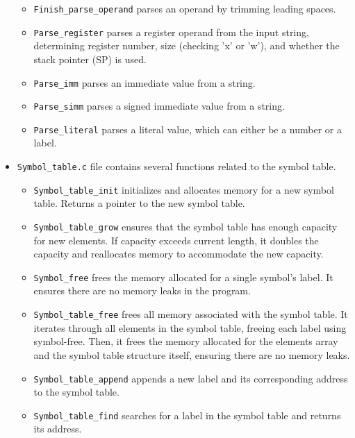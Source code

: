 \documentclass[11pt]{article}
\begin{document}
\begin{itemize}
\begin{itemize}
        \item \verb|Finish_parse_operand| parses an operand by trimming leading spaces.
        
        \item \verb|Parse_register| parses a register operand from the input string, determining register number, size (checking 'x' or 'w'), and whether the stack pointer (SP) is used.
        
        \item \verb|Parse_imm| parses an immediate value from a string.
        
        \item \verb|Parse_simm| parses a signed immediate value from a string.
        
        \item \verb|Parse_literal| parses a literal value, which can either be a number or a label.
        
        \end{itemize}
    \item \verb|Symbol_table.c| file contains several functions related to the symbol table. 
        \begin{itemize}
        \item \verb|Symbol_table_init| initializes and allocates memory for a new symbol table. Returns a pointer to the new symbol table.

        \item \verb|Symbol_table_grow| ensures that the symbol table has enough capacity for new elements. If capacity exceeds current length, it doubles the capacity and reallocates memory to accommodate the new capacity.
        
        \item \verb|Symbol_free| frees the memory allocated for a single symbol's label. It ensures there are no memory leaks in the program.
        
        \item \verb|Symbol_table_free| frees all memory associated with the symbol table. It iterates through all elements in the symbol table, freeing each label using symbol-free. Then, it frees the memory allocated for the elements array and the symbol table structure itself, ensuring there are no memory leaks.
        
        \item \verb|Symbol_table_append| appends a new label and its corresponding address to the symbol table.
        
        \item \verb|Symbol_table_find| searches for a label in the symbol table and returns its address.
        

\end{itemize}
\end{itemize}
\end{document}

